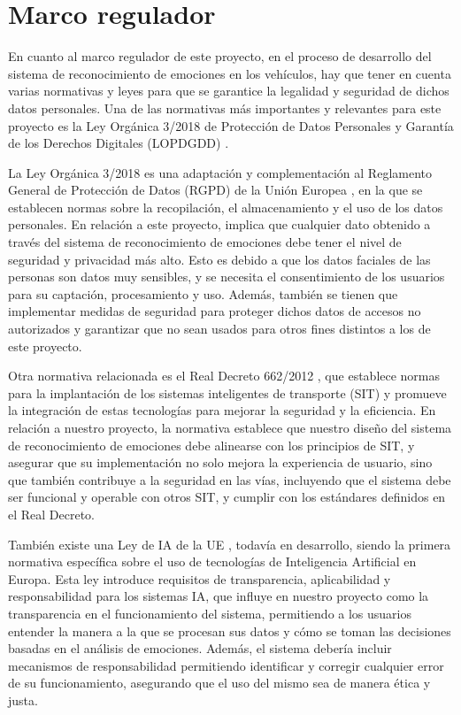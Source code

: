 \documentclass[12pt]{report} %
\begin{document}
\chapter{Marco regulador}

En cuanto al marco regulador de este proyecto, en el proceso de desarrollo del sistema de reconocimiento de emociones en los vehículos, hay que tener en cuenta varias normativas y leyes para que se garantice la legalidad y seguridad de dichos datos personales. Una de las normativas más importantes y relevantes para este proyecto es la Ley Orgánica 3/2018 de Protección de Datos Personales y Garantía de los Derechos Digitales (LOPDGDD) 
\cite{lopd-gdd}.

La Ley Orgánica 3/2018 es una adaptación y complementación al Reglamento General de Protección de Datos (RGPD) de la Unión Europea \cite{rgpd}, en la que se establecen normas sobre la recopilación, el almacenamiento y el uso de los datos personales. En relación a este proyecto, implica que cualquier dato obtenido a través del sistema de reconocimiento de emociones debe tener el nivel de seguridad y privacidad más alto. Esto es debido a que los datos faciales de las personas son datos muy sensibles, y se necesita el consentimiento de los usuarios para su captación, procesamiento y uso. Además, también se tienen que implementar medidas de seguridad para proteger dichos datos de accesos no autorizados y garantizar que no sean usados para otros fines distintos a los de este proyecto. 

Otra normativa relacionada es el Real Decreto 662/2012 \cite{rd-sit}, que establece normas para la implantación de los sistemas inteligentes de transporte (SIT) y promueve la integración de estas tecnologías para mejorar la seguridad y la eficiencia. En relación a nuestro proyecto, la normativa establece que nuestro diseño del sistema de reconocimiento de emociones debe alinearse con los principios de SIT, y asegurar que su implementación no solo mejora la experiencia de usuario, sino que también contribuye a la seguridad en las vías, incluyendo que el sistema debe ser funcional y operable con otros SIT, y cumplir con los estándares definidos en el Real Decreto. 

También existe una Ley de IA de la UE \cite{normativaIA}, todavía en desarrollo, siendo la primera normativa específica sobre el uso de tecnologías de Inteligencia Artificial en Europa. Esta ley introduce requisitos de transparencia, aplicabilidad y responsabilidad para los sistemas IA, que influye en nuestro proyecto como la transparencia en el funcionamiento del sistema, permitiendo a los usuarios entender la manera a la que se procesan sus datos y cómo se toman las decisiones basadas en el análisis de emociones. Además, el sistema debería incluir mecanismos de responsabilidad permitiendo identificar y corregir cualquier error de su funcionamiento, asegurando que el uso del mismo sea de manera ética y justa. 
\end{document}
